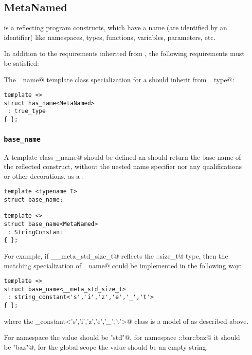\subsection{MetaNamed}
\label{concept-MetaNamed}

 is a  reflecting program constructs, which have a name
(are identified by an identifier) like namespaces, types, functions, variables, parameters, etc.

In addition to the requirements inherited from , the following requirements must
be satisfied:

The \verb@has_name@ template class specialization for a  should
inherit from \verb@true_type@:

\begin{verbatim}
template <>
struct has_name<MetaNamed>
 : true_type
{ };
\end{verbatim}

\subsubsection{\texttt{base\_name}}

A template class \verb@base_name@ should be defined an should return the base name
of the reflected construct, without the nested name specifier nor any qualifications
or other decorations, as a
:

\begin{verbatim}
template <typename T>
struct base_name;

template <>
struct base_name<MetaNamed>
 : StringConstant
{ };
\end{verbatim}

For example, if \verb@__meta_std_size_t@ reflects the \verb@std::size_t@ type,
then the matching specialization of \verb@base_name@ could be implemented in the following
way:

\begin{verbatim}
template <>
struct base_name<__meta_std_size_t>
 : string_constant<'s','i','z','e','_','t'>
{ };
\end{verbatim}

where the \verb@string_constant<'s','i','z','e','_','t'>@ class is a model
of  as described above.

For namespace \verb@std@ the value should be \verb@"std"@, for namespace
\verb@foo::bar::baz@ it should be \verb@"baz"@, for the global scope the
value should be an empty string.

